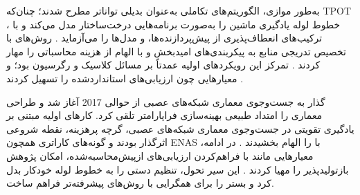 به‌طور موازی، الگوریتم‌های تکاملی به‌عنوان بدیلی تواناتر مطرح شدند؛ چنان‌که TPOT خطوط لوله یادگیری ماشین را به‌صورت برنامه‌هایی درخت‌ساختار مدل می‌کند و با ، ترکیب‌های انعطاف‌پذیری از پیش‌پردازنده‌ها،  و مدل‌ها را می‌آزماید \cite{pmlr-v64-olson_tpot_2016}. روش‌های  با تخصیص تدریجی منابع به پیکربندی‌های امیدبخش و با الهام از  هزینه محاسباتی را مهار کردند \cite{pmlr-v51-jamieson16, JMLR:v18:16-558}. تمرکز این رویکردهای اولیه عمدتاً بر مسائل کلاسیک  و رگرسیون بود؛ و معیارهایی چون  ارزیابی‌های استانداردشده را تسهیل کردند \cite{bischl2021openmlbenchmarkingsuites}.

گذار به جست‌وجوی معماری شبکه‌های عصبی از حوالی 2017 آغاز شد و طراحی معماری را امتداد طبیعی بهینه‌سازی فراپارامتر تلقی کرد. کارهای اولیه مبتنی بر یادگیری تقویتی در جست‌وجوی معماری شبکه‌های عصبی، گرچه پرهزینه، نقطه شروعی اثرگذار بودند و گونه‌های کاراتری همچون ENAS با  را الهام بخشیدند \cite{zoph2017neural, pmlr-v80-pham18a}. در ادامه، معیارهایی مانند  با فراهم‌کردن ارزیابی‌های ازپیش‌محاسبه‌شده، امکان پژوهش بازتولیدپذیر را مهیا کردند \cite{pmlr-v97-ying19a}. این سیر تحول، تنظیم دستی را به خطوط لوله خودکار بدل کرد و بستر را برای همگرایی با روش‌های پیشرفته‌تر فراهم ساخت.